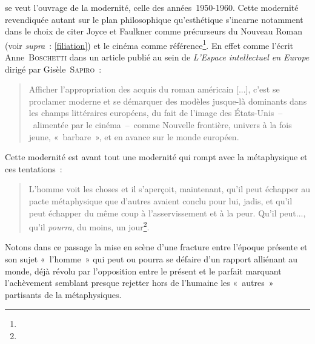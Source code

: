 \documentclass[12pt, a4paper]{article}
\begin{document}
\punr{} se veut l'ouvrage de la modernité, celle des années~1950-1960. Cette modernité revendiquée autant sur le plan philosophique qu'esthétique s'incarne notamment dans le choix de citer Joyce et Faulkner comme précurseurs du Nouveau Roman (voir \textit{supra}~: \ref{filiation}) et le cinéma comme référence\footnote{}. En effet comme l'écrit Anne~\textsc{Boschetti} dans un article publié au sein de \textit{L'Espace intellectuel en Europe} dirigé par Gisèle~\textsc{Sapiro}~:
\begin{quote}
    Afficher l’appropriation des acquis du roman américain [...], c’est se proclamer moderne et se démarquer des modèles jusque-là dominants dans les champs littéraires européens, du fait de l’image des États-Unis~–~alimentée par le cinéma~–~comme Nouvelle frontière, univers à la fois jeune, «~barbare~», et en avance sur le monde européen\int.
\end{quote}
Cette modernité est avant tout une modernité qui rompt avec la métaphysique et ces tentations~:
\begin{quote}
    L’homme voit les choses et il s’aperçoit, maintenant, qu’il peut échapper au pacte métaphysique que d’autres avaient conclu pour lui, jadis, et qu’il peut échapper du même coup à l’asservissement et à la peur. Qu’il peut..., qu’il \textit{pourra}, du moins, un jour\footnote{}.
\end{quote}
Notons dans ce passage la mise en scène d'une fracture entre l'époque présente et son sujet «~l'homme~» qui peut ou pourra se défaire d'un rapport alliénant au monde, déjà révolu par l'opposition entre le présent et le parfait marquant l'achèvement semblant presque rejetter hors de l'humaine les «~autres~» partisants de la métaphysiques.
\end{document}
